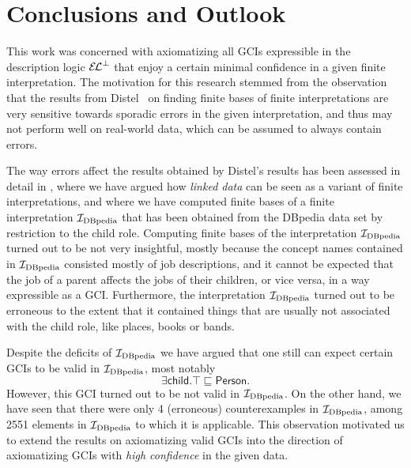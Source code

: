 \chapter{Conclusions and Outlook}
\label{cha:conclusions}

This work was concerned with axiomatizing all GCIs expressible in the description logic
${{\mathcal{E}\kern-.3ex\mathcal{L}}^\bot}$ that enjoy a certain minimal confidence in a given finite interpretation.  The
motivation for this research stemmed from the observation that the results from
Distel~\cite{Diss-Felix} on finding finite bases of finite interpretations are very
sensitive towards sporadic errors in the given interpretation, and thus may not perform
well on real-world data, which can be assumed to always contain errors.

The way errors affect the results obtained by Distel's results has been assessed in detail
in , where we have argued how \emph{linked data} can be
seen as a variant of finite interpretations, and where we have computed finite bases of a
finite interpretation ${\mathcal{I}_{\text{DBpedia}}}$ that has been obtained from the DBpedia data set by
restriction to the \textsf{child} role.  Computing finite bases of the interpretation
${\mathcal{I}_{\text{DBpedia}}}$ turned out to be not very insightful, mostly because the concept names
contained in ${\mathcal{I}_{\text{DBpedia}}}$ consisted mostly of job descriptions, and it cannot be expected
that the job of a parent affects the jobs of their children, or vice versa, in a way
expressible as a GCI.  Furthermore, the interpretation ${\mathcal{I}_{\text{DBpedia}}}$ turned out to be
erroneous to the extent that it contained things that are usually not associated with the
\textsf{child} role, like places, books or bands.

Despite the deficits of ${\mathcal{I}_{\text{DBpedia}}}$ we have argued that one still can expect certain GCIs
to be valid in ${\mathcal{I}_{\text{DBpedia}}}$, most notably
\begin{equation*}
  \exists \mathsf{child}. \top \sqsubseteq \mathsf{Person}.
\end{equation*}
However, this GCI turned out to be not valid in ${\mathcal{I}_{\text{DBpedia}}}$.  On the other hand, we have
seen that there were only 4 (erroneous) counterexamples in ${\mathcal{I}_{\text{DBpedia}}}$, among 2551
elements in ${\mathcal{I}_{\text{DBpedia}}}$ to which it is applicable.  This observation motivated us to
extend the results on axiomatizing valid GCIs into the direction of axiomatizing GCIs with
\emph{high confidence} in the given data.

